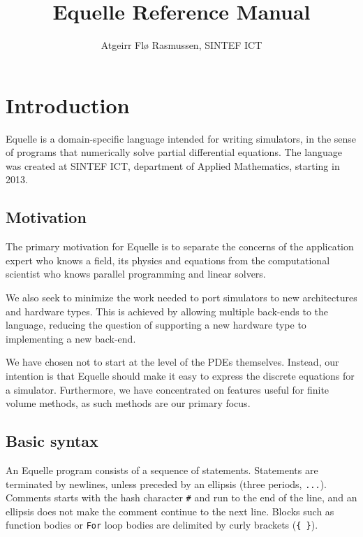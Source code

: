 \documentclass[11pt]{article}
\title{Equelle Reference Manual}
\author{Atgeirr Fl{\o} Rasmussen, SINTEF ICT}
\newcommand{\code}[1]{\texttt{#1}}
\begin{document}
\maketitle

\newpage

\tableofcontents

\newpage

\section{Introduction}

Equelle is a domain-specific language intended for writing simulators, in the sense of
programs that numerically solve partial differential equations. The language was created
at SINTEF ICT, department of Applied Mathematics, starting in 2013.

\subsection{Motivation}

The primary motivation for Equelle is to separate the concerns of the application expert
who knows a field, its physics and equations from the computational scientist who knows
parallel programming and linear solvers.

We also seek to minimize the work needed to port simulators to new architectures and
hardware types. This is achieved by allowing multiple back-ends to the language, reducing
the question of supporting a new hardware type to implementing a new back-end.

We have chosen not to start at the level of the PDEs themselves. Instead, our intention is
that Equelle should make it easy to express the discrete equations for a simulator.
Furthermore, we have concentrated on features useful for finite volume methods, as such
methods are our primary focus.

\subsection{Basic syntax}

An Equelle program consists of a sequence of statements. Statements are terminated by
newlines, unless preceded by an ellipsis (three periods, \code{...}). Comments starts with
the hash character \code{\#} and run to the end of the line, and an ellipsis does not make
the comment continue to the next line. Blocks such as function bodies or \code{For} loop
bodies are delimited by curly brackets (\code{\{ \}}).
\end{document}
